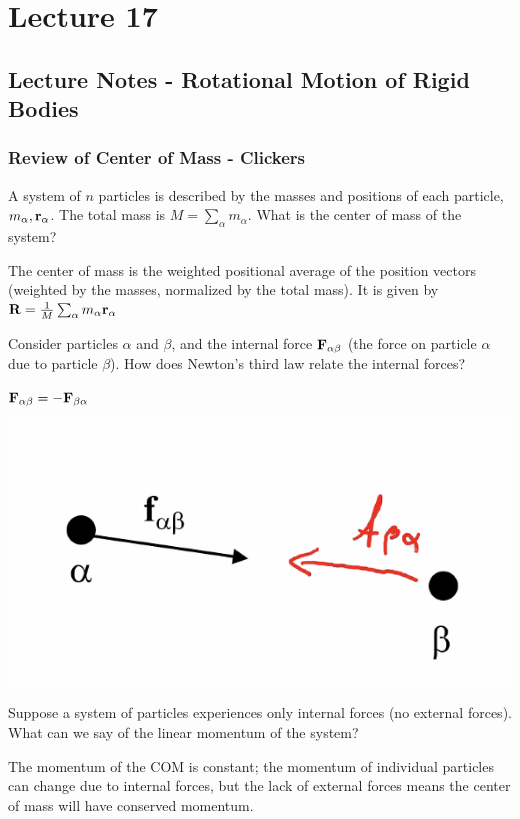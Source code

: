 \documentclass[../PHYS306Notes.tex]{subfiles}
\begin{document}
\section{Lecture 17}
\subsection{Lecture Notes - Rotational Motion of Rigid Bodies}
\subsubsection{Review of Center of Mass - Clickers}
A system of $n$ particles is described by the masses and positions of each particle, $m_\alpha, \mathbf{r}_\alpha$. The total mass is $M = \sum_{\alpha}m_\alpha$. What is the center of mass of the system?
\begin{s}
The center of mass is the weighted positional average of the position vectors (weighted by the masses, normalized by the total mass). It is given by $\mathbf{R} = \frac{1}{M}\sum_{\alpha}m_\alpha\mathbf{r}_{\alpha}$
\end{s}
Consider particles $\alpha$ and $\beta$, and the internal force $\mathbf{F}_{\alpha\beta}$
(the force on particle $\alpha$ due to particle $\beta$). How does Newton's third law relate the internal forces?
\begin{s}
$\mathbf{F}_{\alpha\beta} = -\mathbf{F}_{\beta\alpha}$
\end{s}
\begin{center}
    \includegraphics[scale=0.5]{Lecture-17/l17-img1.png}
\end{center}
Suppose a system of particles experiences only internal forces (no external forces). What can we say of the linear momentum of the system?
\begin{s}
The momentum of the COM is constant; the momentum of individual particles can change due to internal forces, but the lack of external forces means the center of mass will have conserved momentum. 
\end{s}
\end{document}
